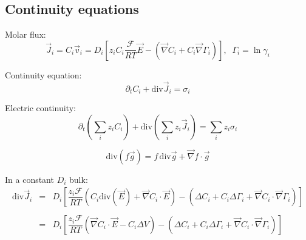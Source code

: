 \documentclass[aps,12pt]{revtex4}
\begin{document}
\subsection{Continuity equations}

Molar flux:
\begin{equation}
	\vec{J}_i = C_i \vec{v}_i = D_i \left[z_i C_i  \dfrac{\mathcal{F}}{RT} \vec{E} - \left(\vec{\nabla} C_i + C_i \vec{\nabla}\Gamma_i\right) \right],\;\;\Gamma_i = \ln \gamma_i
\end{equation}

Continuity equation:
\begin{equation}
	\partial_t C_i + \mathrm{div} \vec{J}_i = \sigma_i
\end{equation}

Electric continuity:
\begin{equation}
	\partial_t \left(\sum_i z_i C_i\right) + \mathrm{div} \left(\sum_i z_i \vec{J}_i\right) = \sum_i z_i \sigma_i
\end{equation}


\begin{equation}
	\mathrm{div}(f\vec{g}) = f \, \mathrm{div}\vec{g} + \vec{\nabla} f \cdot \vec{g}
\end{equation}

In a constant $D_i$ bulk:
\begin{equation}
\begin{array}{rcl}
\mathrm{div} \vec{J}_i & = & D_i \left[ \dfrac{z_i\mathcal{F}}{RT} 
\left(C_i \mathrm{div}\left(\vec{E}\right) + \vec{\nabla} C_i \cdot \vec{E} \right) 
- \left( \Delta C_i + C_i \Delta \Gamma_i + \vec{\nabla} C_i \cdot \vec{\nabla} \Gamma_i \right)
\right]\\
\\
 & = &  D_i \left[ \dfrac{z_i\mathcal{F}}{RT} 
\left(  \vec{\nabla} C_i \cdot \vec{E} - C_i \Delta V \right) 
- \left( \Delta C_i + C_i \Delta \Gamma_i + \vec{\nabla} C_i \cdot \vec{\nabla} \Gamma_i \right)
\right]\\
\end{array}
\end{equation}
\end{document}
